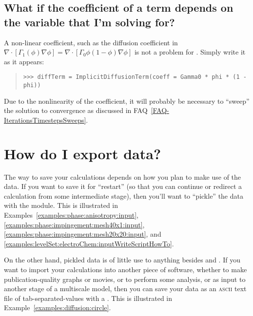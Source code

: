         \subsection{What if the coefficient of a term depends on 
            the variable that I'm solving for?}
            
            A non-linear coefficient, such as the diffusion 
            coefficient in \( 
            \nabla\cdot[\Gamma_1(\phi) \nabla \phi] = 
            \nabla\cdot[\Gamma_0 \phi (1 - \phi) \nabla\phi] \) is 
            not a problem for \FiPy. Simply write it as it appears:
            \begin{quote}
\begin{verbatim}
>>> diffTerm = ImplicitDiffusionTerm(coeff = Gamma0 * phi * (1 - phi))
\end{verbatim}
            \end{quote}
            \begin{reSTadmonition}[Note]
            Due to the nonlinearity of the coefficient, it will
            probably be necessary to ``sweep'' the solution to
            convergence as discussed in
            FAQ~\ref{FAQ-IterationsTimestepsSweeps}.
            \end{reSTadmonition}


    \section{How do I export data?} The way to save your calculations
    depends on how you plan to make use of the data. If you want to
    save it for ``restart'' (so that you can continue or redirect a
    calculation from some intermediate stage), then you'll want to
    ``pickle'' the \Python{} data with the  module. This
    is illustrated in Examples~\ref{examples:phase:anisotropy:input},
    \ref{examples:phase:impingement:mesh40x1:input},
    \ref{examples:phase:impingement:mesh20x20:input}, and
    \ref{examples:levelSet:electroChem:inputWriteScriptHowTo}.
    
    On the other hand, pickled \FiPy{} data is of little use to
    anything besides \Python{} and \FiPy{}. If you want to import your
    calculations into another piece of software, whether to make
    publication-quality graphs or movies, or to perform some analysis,
    or as input to another stage of a multiscale model, then you can
    save your data as an \textsc{ascii} text file of
    tab-separated-values with a . This is 
    illustrated in Example~\ref{examples:diffusion:circle}.
    
